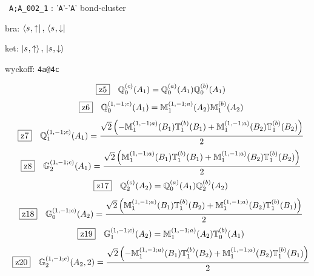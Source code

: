\documentclass[fleqn,10pt,landscape]{jsarticle}
\begin{document}
\noindent\textbullet\, \texttt{A;A_002_1} : '\texttt{A}'-'\texttt{A}' bond-cluster

\noindent\quad * bra: $\bra{s_{},\uparrow},\, \bra{s_{},\downarrow}$

\noindent\quad * ket: $\ket{s_{},\uparrow},\, \ket{s_{},\downarrow}$

\noindent\quad * wyckoff: \texttt{4a@4c}

\begin{dmath*}
\hspace*{3mm}\fbox{z5}\quad \mathbb{Q}_{0}^{(c)}(A_{1})=\mathbb{Q}_{0}^{(a)}(A_{1}) \mathbb{Q}_{0}^{(b)}(A_{1})
\end{dmath*}
\begin{dmath*}
\hspace*{3mm}\fbox{z6}\quad \mathbb{Q}_{0}^{(1,-1;c)}(A_{1})=\mathbb{M}_{1}^{(1,-1;a)}(A_{2}) \mathbb{M}_{1}^{(b)}(A_{2})
\end{dmath*}
\begin{dmath*}
\hspace*{3mm}\fbox{z7}\quad \mathbb{Q}_{1}^{(1,-1;c)}(A_{1})=\frac{\sqrt{2} \left(- \mathbb{M}_{1}^{(1,-1;a)}(B_{1}) \mathbb{T}_{1}^{(b)}(B_{1}) + \mathbb{M}_{1}^{(1,-1;a)}(B_{2}) \mathbb{T}_{1}^{(b)}(B_{2})\right)}{2}
\end{dmath*}
\begin{dmath*}
\hspace*{3mm}\fbox{z8}\quad \mathbb{G}_{2}^{(1,-1;c)}(A_{1})=\frac{\sqrt{2} \left(\mathbb{M}_{1}^{(1,-1;a)}(B_{1}) \mathbb{T}_{1}^{(b)}(B_{1}) + \mathbb{M}_{1}^{(1,-1;a)}(B_{2}) \mathbb{T}_{1}^{(b)}(B_{2})\right)}{2}
\end{dmath*}
\begin{dmath*}
\hspace*{3mm}\fbox{z17}\quad \mathbb{Q}_{2}^{(c)}(A_{2})=\mathbb{Q}_{0}^{(a)}(A_{1}) \mathbb{Q}_{2}^{(b)}(A_{2})
\end{dmath*}
\begin{dmath*}
\hspace*{3mm}\fbox{z18}\quad \mathbb{G}_{0}^{(1,-1;c)}(A_{2})=\frac{\sqrt{2} \left(\mathbb{M}_{1}^{(1,-1;a)}(B_{1}) \mathbb{T}_{1}^{(b)}(B_{2}) + \mathbb{M}_{1}^{(1,-1;a)}(B_{2}) \mathbb{T}_{1}^{(b)}(B_{1})\right)}{2}
\end{dmath*}
\begin{dmath*}
\hspace*{3mm}\fbox{z19}\quad \mathbb{G}_{1}^{(1,-1;c)}(A_{2})=\mathbb{M}_{1}^{(1,-1;a)}(A_{2}) \mathbb{T}_{0}^{(b)}(A_{1})
\end{dmath*}
\begin{dmath*}
\hspace*{3mm}\fbox{z20}\quad \mathbb{G}_{2}^{(1,-1;c)}(A_{2},2)=\frac{\sqrt{2} \left(- \mathbb{M}_{1}^{(1,-1;a)}(B_{1}) \mathbb{T}_{1}^{(b)}(B_{2}) + \mathbb{M}_{1}^{(1,-1;a)}(B_{2}) \mathbb{T}_{1}^{(b)}(B_{1})\right)}{2}
\end{dmath*}
\end{document}
